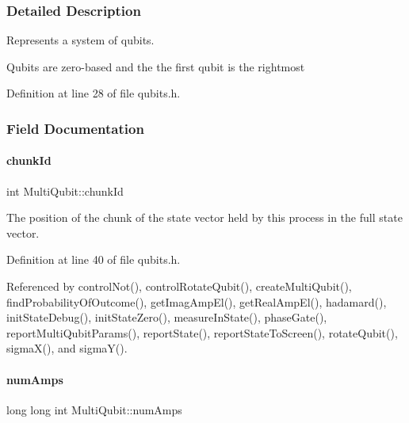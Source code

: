 \subsubsection{Detailed Description}
Represents a system of qubits. 

Qubits are zero-\/based and the the first qubit is the rightmost 

Definition at line 28 of file qubits.\+h.



\subsubsection{Field Documentation}
\mbox{\label{structMultiQubit_ab10c88249fa3825d6227ceec01d37e37}} 
\paragraph{\texorpdfstring{chunk\+Id}{chunkId}}
{\footnotesize\ttfamily int Multi\+Qubit\+::chunk\+Id}



The position of the chunk of the state vector held by this process in the full state vector. 



Definition at line 40 of file qubits.\+h.



Referenced by control\+Not(), control\+Rotate\+Qubit(), create\+Multi\+Qubit(), find\+Probability\+Of\+Outcome(), get\+Imag\+Amp\+El(), get\+Real\+Amp\+El(), hadamard(), init\+State\+Debug(), init\+State\+Zero(), measure\+In\+State(), phase\+Gate(), report\+Multi\+Qubit\+Params(), report\+State(), report\+State\+To\+Screen(), rotate\+Qubit(), sigma\+X(), and sigma\+Y().

\mbox{\label{structMultiQubit_ae16f47d8b725c914fb7f66b6498d79db}} 
\paragraph{\texorpdfstring{num\+Amps}{numAmps}}
{\footnotesize\ttfamily long long int Multi\+Qubit\+::num\+Amps}



